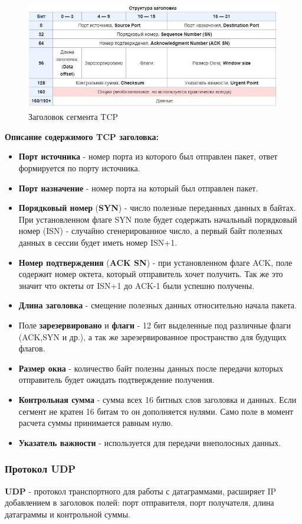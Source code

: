 \begin{figure}
\centering
\includegraphics{./files/tcp_header_scheme.jpg}
\caption{Заголовок сегмента TCP}
\end{figure}

\textbf{Описание содержимого TCP заголовка:}

\begin{itemize}
\item
  \textbf{Порт источника} - номер порта из которого был отправлен пакет,
  ответ формируется по порту источника.
\item
  \textbf{Порт назначение} - номер порта на который был отправлен пакет.
\item
  \textbf{Порядковый номер} (\textbf{SYN}) - число полезные переданных
  данных в байтах. При установленном флаге SYN поле будет содержать
  начальный порядковый номер (ISN) - случайно сгенерированное число, а
  первый байт полезных данных в сессии будет иметь номер ISN+1.
\item
  \textbf{Номер подтверждения} (\textbf{ACK SN}) - при установленном
  флаге ACK, поле содержит номер октета, который отправитель хочет
  получить. Так же это значит что октеты от ISN+1 до ACK-1 были успешно
  получены.
\item
  \textbf{Длина заголовка} - смещение полезных данных относительно
  начала пакета.
\item
  Поле \textbf{зарезервировано} и \textbf{флаги} - 12 бит выделенные под
  различные флаги (ACK,SYN и др.), а так же зарезервированное
  пространство для будущих флагов.
\item
  \textbf{Размер окна} - количество байт полезны данных после передачи
  которых отправитель будет ожидать подтверждение получения.
\item
  \textbf{Контрольная сумма} - сумма всех 16 битных слов заголовка и
  данных. Если сегмент не кратен 16 битам то он дополняется нулями. Само
  поле в момент расчета суммы принимается равным нулю.
\item
  \textbf{Указатель важности} - используется для передачи внеполосных
  данных.
\end{itemize}

\hypertarget{ux43fux440ux43eux442ux43eux43aux43eux43b-udp}{%
\subsubsection{Протокол
UDP}\label{ux43fux440ux43eux442ux43eux43aux43eux43b-udp}}

\textbf{UDP} - протокол транспортного для работы с датаграммами,
расширяет IP добавлением в заголовок полей: порт отправителя, порт
получателя, длина датаграммы и контрольной суммы.

